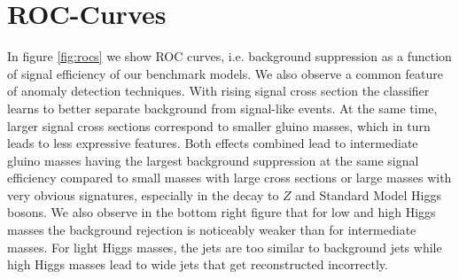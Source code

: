 \documentclass[prd, twocolumn, superscriptaddress,floatfix, nofootinbib, preprintnumbers]{revtex4-2}
\begin{document}
\section{ROC-Curves}
In figure \ref{fig:rocs} we show ROC curves, i.e. background suppression as a function of signal efficiency of our benchmark models. We also observe a common feature of anomaly detection techniques. With rising signal cross section the classifier learns to better separate background from signal-like events. At the same time, larger signal cross sections correspond to smaller gluino masses, which in turn leads to less expressive features. Both effects combined lead to intermediate gluino masses having the largest background suppression at the same signal efficiency compared to small masses with large cross sections or large masses with very obvious signatures, especially in the decay to $Z$ and Standard Model Higgs bosons. We also observe in the bottom right figure that for low and high Higgs masses the background rejection is noticeably weaker than for intermediate masses. For light Higgs masses, the jets are too similar to background jets while high Higgs masses lead to wide jets that get reconstructed incorrectly.
\label{sec:roc_curve}
\end{document}
